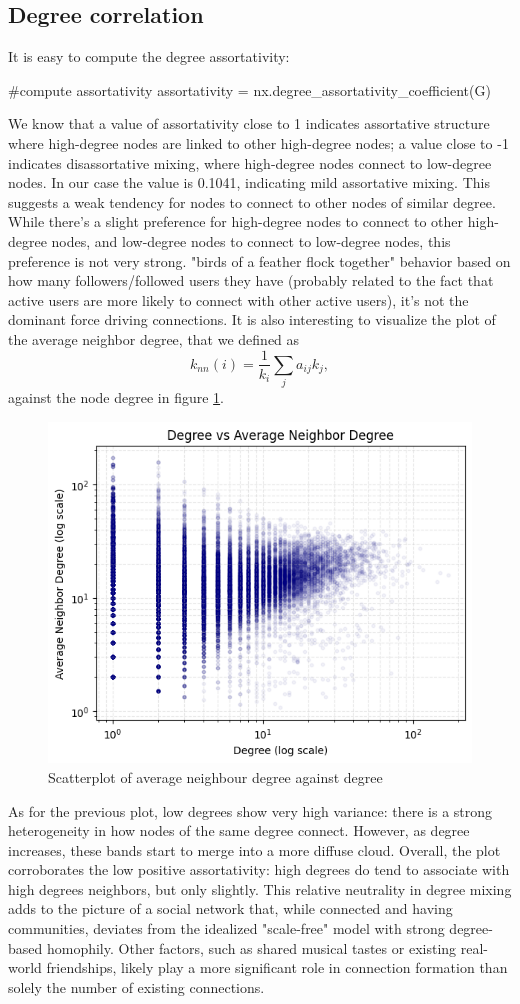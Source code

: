 \documentclass[12pt]{article}
\begin{document}
\subsection{Degree correlation}
It is easy to compute the degree assortativity:
\begin{py}
	#compute assortativity
	assortativity = nx.degree_assortativity_coefficient(G)
\end{py}
We know that a value of assortativity close to 1 indicates assortative structure where high-degree nodes are linked to other high-degree nodes; a value close to -1 indicates disassortative mixing, where high-degree nodes connect to low-degree nodes. In our case the value is 0.1041, indicating mild assortative mixing. This suggests a weak tendency for nodes to connect to other nodes of similar degree. While there's a slight preference for high-degree nodes to connect to other high-degree nodes, and low-degree nodes to connect to low-degree nodes, this preference is not very strong. "birds of a feather flock together" behavior based on how many followers/followed users they have (probably related to the fact that active users are more likely to connect with other active users), it's not the dominant force driving connections. It is also interesting to visualize the plot of the average neighbor degree, that we defined as
\begin{equation*}
	k_{nn}(i)=\frac{1}{k_{i}}\sum_{j}a_{ij}k_{j},
\end{equation*}
 against the node degree in figure \ref{fig:screenshot007}.
\begin{figure}[h]
	\centering
	\includegraphics[width=0.6\linewidth]{screenshot007}
	\caption{Scatterplot of average neighbour degree against degree}
	\label{fig:screenshot007}
\end{figure}
As for the previous plot, low degrees show very high variance: there is a strong heterogeneity in how nodes of the same degree connect. However, as degree increases, these bands start to merge into a more diffuse cloud. Overall, the plot corroborates the low positive assortativity: high degrees do tend to associate with high degrees neighbors, but only slightly. This relative neutrality in degree mixing adds to the picture of a social network that, while connected and having communities, deviates from the idealized "scale-free" model with strong degree-based homophily. Other factors, such as shared musical tastes or existing real-world friendships, likely play a more significant role in connection formation than solely the number of existing connections.
\end{document}

